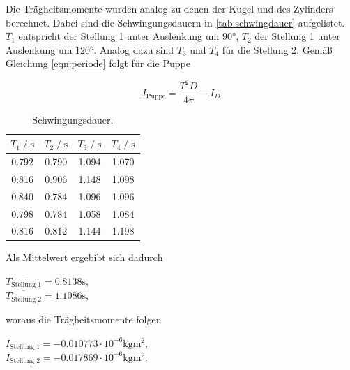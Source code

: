 Die Trägheitsmomente wurden analog zu denen der Kugel und des Zylinders berechnet. Dabei sind die Schwingungsdauern in \autoref{tab:schwingdauer}
aufgelistet.
$T_1$ entspricht der Stellung 1 unter Auslenkung um $90°$, $T_2$ der Stellung 1 unter Auslenkung um $120°$.
Analog dazu sind $T_3$ und $T_4$ für die Stellung 2. Gemäß Gleichung \autoref{eqn:periode} folgt für die Puppe


\begin{equation*}
  I_{\text{Puppe}} = \frac{T^2D}{4\pi} - I_D
\end{equation*}

\begin{table}[H]
    \centering
        \caption{Schwingungsdauer.}
        \label{tab:schwingdauer}
        \begin{tabular}{c c c c}
        \toprule
        $T_1 \;/\; \si{\second}$ & $T_2 \;/\; \si{\second}$ & $T_3 \;/\; \si{\second}$ & $T_4 \;/\; \si{\second}$ \\
        \midrule
        0.792 & 0.790 & 1.094 & 1.070 \\
        0.816 & 0.906 & 1.148 & 1.098 \\
        0.840 & 0.784 & 1.096 & 1.096 \\
        0.798 & 0.784 & 1.058 & 1.084 \\
        0.816 & 0.812 & 1.144 & 1.198 \\
        \bottomrule
    \end{tabular}
\end{table}


Als Mittelwert ergebibt sich dadurch
\begin{center}
  $\overline{T_{\text{Stellung 1}}} = 0.8138 \si{\second}$, \\
  $\overline{T_{\text{Stellung 2}}} = 1.1086 \si{\second}$, \\
\end{center}


woraus die Trägheitsmomente folgen %
\begin{center}
  $I_{\text{Stellung 1}} = -0.010773 \cdot 10^{-6} \si{\kilogram\meter^2}$, \\
  $I_{\text{Stellung 2}} = -0.017869 \cdot 10^{-6} \si{\kilogram\meter^2}$. \\
\end{center}


